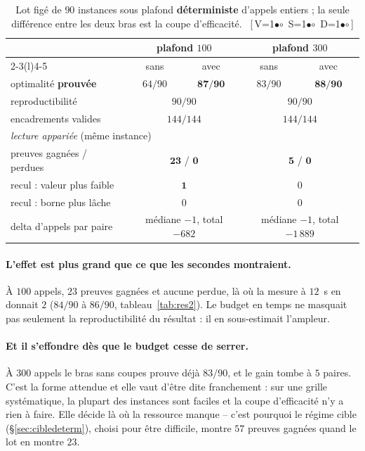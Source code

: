 \documentclass[11pt,a4paper]{article}
\theoremstyle{plain}
\theoremstyle{remark}
\newcommand{\cfgm}[1]{\ifnum#1=1$\bullet$\else$\circ$\fi}
\newcommand{\conf}[3]{%
  \textsf{\footnotesize[\,V\cfgm{#1}\ S\cfgm{#2}\ D\cfgm{#3}\,]}}
\begin{document}
\begin{table}[H]
\centering
\caption{Lot figé de $90$ instances sous plafond \textbf{déterministe}
d'appels entiers ; la seule différence entre les deux bras est la coupe
d'efficacité.\ \conf{1}{1}{1}}
\label{tab:lotdeterm}
\setlength{\tabcolsep}{6pt}
\begin{tabular}{lcccc}
\toprule
& \multicolumn{2}{c}{plafond $100$} & \multicolumn{2}{c}{plafond $300$}\\
\cmidrule(lr){2-3}\cmidrule(l){4-5}
& sans & avec & sans & avec\\
\midrule
optimalité \textbf{prouvée} & $64/90$ & $\mathbf{87/90}$
                            & $83/90$ & $\mathbf{88/90}$\\
reproductibilité & \multicolumn{2}{c}{$90/90$} & \multicolumn{2}{c}{$90/90$}\\
encadrements valides & \multicolumn{2}{c}{$144/144$}
                     & \multicolumn{2}{c}{$144/144$}\\
\midrule
\multicolumn{5}{l}{\emph{lecture appariée} (même instance)}\\
preuves gagnées / perdues & \multicolumn{2}{c}{$\mathbf{23}$ / $\mathbf{0}$}
                          & \multicolumn{2}{c}{$\mathbf{5}$ / $\mathbf{0}$}\\
recul : valeur plus faible & \multicolumn{2}{c}{$\mathbf{1}$}
                           & \multicolumn{2}{c}{$0$}\\
recul : borne plus lâche & \multicolumn{2}{c}{$0$}
                         & \multicolumn{2}{c}{$0$}\\
delta d'appels par paire & \multicolumn{2}{c}{médiane $-1$, total $-682$}
                         & \multicolumn{2}{c}{médiane $-1$, total $-1\,889$}\\
\bottomrule
\end{tabular}
\end{table}

\paragraph{L'effet est plus grand que ce que les secondes montraient.}
À $100$ appels, $23$ preuves gagnées et aucune perdue, là où la mesure à
$12$~s en donnait $2$ ($84/90$ à $86/90$, tableau~\ref{tab:res2}). Le budget
en temps ne masquait pas seulement la reproductibilité du résultat : il en
sous-estimait l'ampleur.

\paragraph{Et il s'effondre dès que le budget cesse de serrer.} À $300$
appels le bras sans coupes prouve déjà $83/90$, et le gain tombe à $5$
paires. C'est la forme attendue et elle vaut d'être dite franchement : sur
une grille systématique, la plupart des instances sont faciles et la coupe
d'efficacité n'y a rien à faire. Elle décide là où la ressource manque --
c'est pourquoi le régime cible (§\ref{sec:cibledeterm}), choisi pour être
difficile, montre $57$ preuves gagnées quand le lot en montre $23$.
\end{document}
